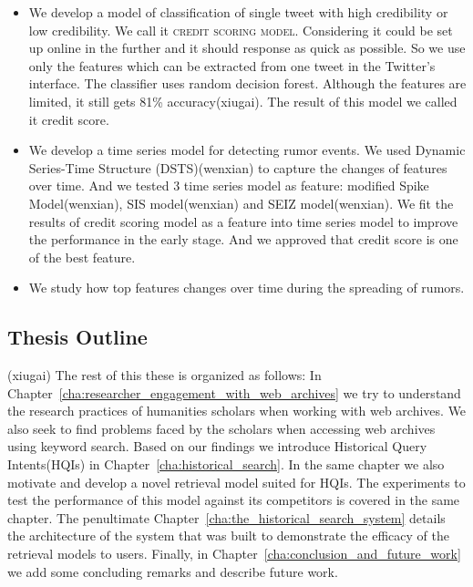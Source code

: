 \begin{itemize}
	
	\item We develop a model of classification of single tweet with high credibility or low credibility. We call it \textsc{credit scoring model}. Considering it could be set up online in the further and it should response as quick as possible. So we use only the features which can be extracted from one tweet in the Twitter's interface. The classifier uses random decision forest. Although the features are limited,  it still gets 81\% accuracy(xiugai). The result of this model we called it credit score.

 	\item We develop a time series model for detecting rumor events. We used Dynamic Series-Time Structure (DSTS)(wenxian) to capture the changes of features over time. And we tested 3 time series model as feature: modified Spike Model(wenxian), SIS model(wenxian) and SEIZ model(wenxian). We fit the results of credit scoring model as a feature into time series model to improve the performance in the early stage. And we approved that credit score is one of the best feature.

 	\item We study how top features changes over time during the spreading of rumors.

 \end{itemize}
 
 
\subsection{Thesis Outline}

(xiugai)
The rest of this these is organized as follows: In Chapter~\ref{cha:researcher_engagement_with_web_archives} we try to understand the research practices of humanities scholars when working with web archives. We also seek to find problems faced by the scholars when accessing web archives using keyword search. Based on our findings we introduce Historical Query Intents(HQIs) in Chapter~\ref{cha:historical_search}. In the same chapter we also motivate and develop a novel retrieval model suited for HQIs. The experiments to test the performance of this model against its competitors is covered in the same chapter. The penultimate Chapter~\ref{cha:the_historical_search_system} details the architecture of the system that was built to demonstrate the efficacy of the retrieval models to users. Finally, in Chapter~\ref{cha:conclusion_and_future_work} we add some concluding remarks and describe future work.


